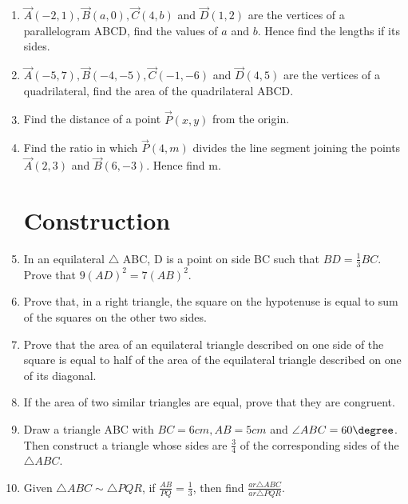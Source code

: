 \begin{enumerate}
	\item $\vec{A}(-2,1), \vec{B}(a,0), \vec{C}(4,b)$ and  $\vec{D}(1,2)$ are the vertices of a parallelogram {ABCD}, find the values of $a$ and $b$. Hence find the lengths if its sides.
	\item $\vec{A}(-5,7), \vec{B}(-4,-5), \vec{C}(-1,-6)$ and $\vec{D}(4,5)$ are the vertices of a quadrilateral, find the area of the quadrilateral ABCD.

			\item Find the distance of a point $\vec{P}(x,y)$ from the origin.
			\item Find the ratio in which $\vec{P}(4,m)$ divides the line segment joining the points $\vec{A}(2,3)$ and $\vec{B}(6,-3)$. Hence find m.

		\section{Construction}
	\item In an equilateral $\triangle$ ABC, D is a point on side BC such that $ BD =\frac{1}{3}BC$. Prove that $9(AD)^2 = 7(AB)^2$.
	\item Prove that, in a right triangle, the  square on the hypotenuse is equal to sum of the squares on the other two sides.
	\item Prove that the area of an equilateral triangle described on one side of the square is equal to half of the area of the equilateral triangle described on one of its diagonal.
	\item If the area of two similar triangles are equal, prove that they are congruent.
	\item Draw a triangle ABC with $BC=6 cm, AB=5 cm$ and $\angle{ABC}=60\degree$. Then construct a triangle whose sides are $\frac{3}{4}$ of the corresponding sides of the $\triangle ABC$.

	\item Given $\triangle ABC \sim  \triangle PQR$, if $\frac{AB}{PQ} = \frac{1}{3}$, then find $\frac{ar \triangle ABC}{ar \triangle PQR}$.
\end{enumerate}
